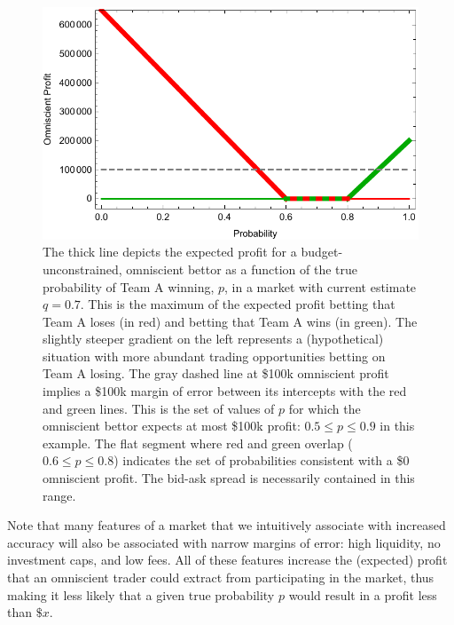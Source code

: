 \documentclass[sigconf,anonymous]{aamas}   %
\begin{document}
\begin{figure}
\centering
\includegraphics[width=\columnwidth]{god-profit.pdf}
\caption{
The thick line depicts the expected profit for a budget-unconstrained, omniscient bettor as a function of the true probability of Team A winning, $p$, in a market with current estimate $q=0.7$.
This is the maximum of the expected profit betting that Team A loses (in red) and betting that Team A wins (in green).
The slightly steeper gradient on the left represents a (hypothetical) situation with more abundant trading opportunities betting on Team A losing.
The gray dashed line at \$100k omniscient profit implies a \$100k margin of error between its intercepts with the red and green lines.
This is the set of values of $p$ for which the omniscient bettor expects at most \$100k profit: $0.5\le p\le 0.9$ in this example.
The flat segment where red and green overlap ($0.6\le p\le 0.8$) indicates the set of probabilities consistent with a \$0 omniscient profit. 
The bid-ask spread is necessarily contained in this range.}
\label{fig:godprofit}
\end{figure}


Note that many features of a market that we intuitively associate with increased accuracy will also be associated with narrow margins of error: high liquidity, no investment caps, and low fees. All of these features increase the (expected) profit that an omniscient trader could extract from participating in the market, thus making it less likely that a given true probability $p$ would result in a profit less than $\$x$.
\end{document}
